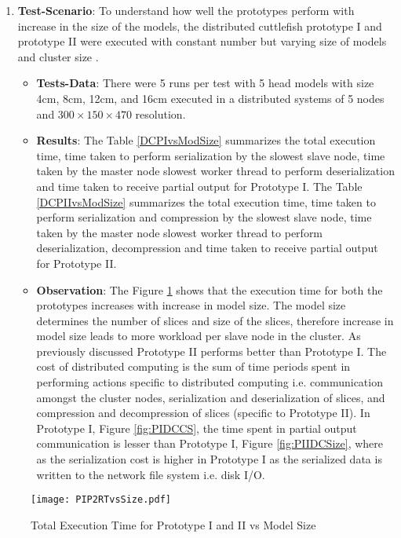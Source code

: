 \begin{enumerate}
\item \textbf{Test-Scenario}: To understand how well the prototypes perform with increase in the size of the models, the distributed cuttlefish prototype I and prototype II were executed with constant number but varying size of models and cluster size . 
\begin{itemize}
\item \textbf{Tests-Data}: There were 5 runs per test with 5 head models with size 4cm, 8cm, 12cm, and 16cm executed in a distributed systems of 5 nodes and \begin{math} 300 \times 150 \times 470 \end{math} resolution.  
\item \textbf{Results}: The Table \ref{DCPIvsModSize} summarizes the total execution time, time taken to perform serialization by the slowest slave node, time taken by the master node slowest worker thread to perform deserialization and time taken to receive partial output for Prototype I. The Table \ref{DCPIIvsModSize} summarizes the total execution time, time taken to perform serialization and compression by the slowest slave node, time taken by the master node slowest worker thread to perform deserialization, decompression and time taken to receive partial output for Prototype II.
\item \textbf{Observation}: The Figure \ref{fig:RTvsSize} shows that the execution time for both the prototypes increases with increase in model size. The model size determines the number of slices and size of the slices, therefore increase in model size leads to more workload per slave node in the cluster. As previously discussed Prototype II performs better than Prototype I. The cost of distributed computing is the sum of time periods spent in performing actions specific to distributed computing i.e. communication amongst the cluster nodes, serialization and deserialization of slices, and compression and decompression of slices (specific to Prototype II). In Prototype I, Figure \ref{fig:PIDCCS}, the time spent in partial output communication is lesser than Prototype I, Figure \ref{fig:PIIDCSize}, where as the serialization cost is higher in Prototype I as the serialized data is written to the network file system i.e. disk I/O.    
\end{itemize}
\end{enumerate}


\begin{figure}[t]
\centering
\texttt{[image: PIP2RTvsSize.pdf]}
\caption{Total Execution Time for Prototype I and II vs Model Size}
\label{fig:RTvsSize}
\end{figure}

